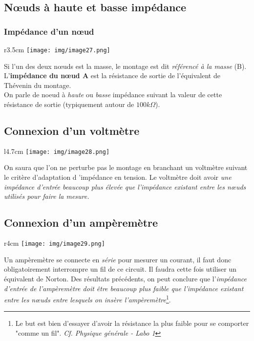 \documentclass	[11pt, a4paper, openany]{book}
\begin{document}
\subsection{Nœuds à haute et basse impédance}
\subsubsection{Impédance d'un nœud}
\begin{wrapfigure}[6]{r}{3.5cm}
\texttt{[image: img/image27.png]}
\end{wrapfigure}
Si l'un des deux nœuds est la masse, le montage est dit \textit{référencé à la masse} (B).\\
L'\textbf{impédance du nœud A} est la résistance de sortie de l'équivalent de Thévenin du montage.\\
On parle de noeud à \textit{haute} ou \textit{basse} impédance suivant la valeur de cette résistance de sortie (typiquement autour de $100 k\Omega$).


\subsection{Connexion d'un voltmètre}
\begin{wrapfigure}[6]{l}{4.7cm}
\texttt{[image: img/image28.png]}
\end{wrapfigure}
On saura que l'on ne perturbe pas le montage en branchant un voltmètre suivant le critère d'adaptation d 'impédance en tension. Le voltmètre doit avoir \textit{une impédance d'entrée beaucoup plus élevée que l'impédance existant entre les nœuds utilisés pour faire la mesure.}\ \\

\subsection{Connexion d'un ampèremètre}
\begin{wrapfigure}[6]{r}{4cm}
\texttt{[image: img/image29.png]}
\end{wrapfigure}
Un  ampèremètre se connecte en \textit{série} pour mesurer un courant, il faut donc obligatoirement interrompre un fil de ce circuit. Il faudra cette fois utiliser un équivalent de Norton. Des résultats précédents, on peut conclure que l'\textit{impédance d'entrée de l'ampèremètre doit être beaucoup plus faible que l'impédance existant entre les nœuds entre lesquels on insère l'ampèremètre}\footnote{Le but est bien d'essayer d'avoir la résistance la plus faible pour se comporter "comme un fil". \textit{Cf. Physique générale - Labo 1}}.
\end{document}
